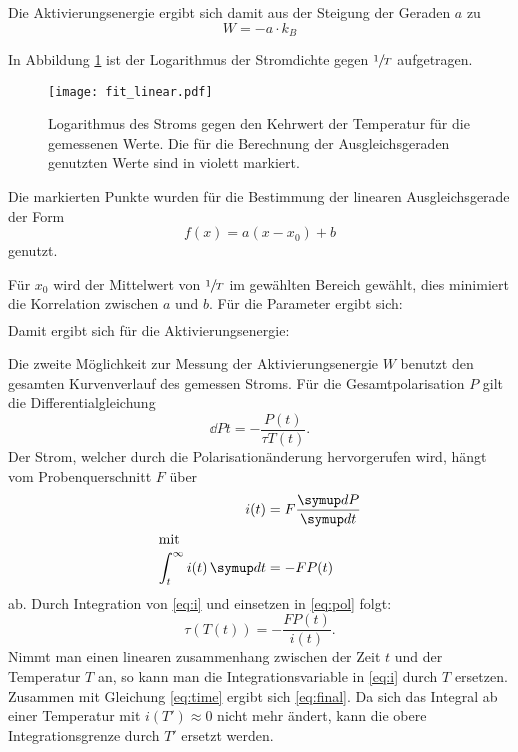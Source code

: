 Die Aktivierungsenergie ergibt sich damit aus der Steigung der Geraden $a$ zu
\begin{equation}
  W = - a \cdot k_B
\end{equation}

In Abbildung \ref{fig:lnj} ist der Logarithmus der Stromdichte gegen $\sfrac{1}{T}$ aufgetragen.

\begin{figure}
  \texttt{[image: fit\_linear.pdf]}
  \caption{%
    Logarithmus des Stroms gegen den Kehrwert der Temperatur für die gemessenen Werte.
    Die für die Berechnung der Ausgleichsgeraden genutzten Werte sind in violett markiert.
  }
  \label{fig:lnj}
\end{figure}

Die markierten Punkte wurden für die Bestimmung der linearen Ausgleichsgerade der Form
\begin{equation}
  f(x) = a (x - x_0) + b
\end{equation}
genutzt.

Für $x_0$ wird der Mittelwert von $\sfrac{1}{T}$ im gewählten Bereich gewählt, dies minimiert die Korrelation zwischen $a$ und $b$.
Für die Parameter ergibt sich:
\begin{align}
  
\end{align}
Damit ergibt sich für die Aktivierungsenergie:
\begin{equation}
  
\end{equation}


Die zweite Möglichkeit zur Messung der Aktivierungsenergie $W$ benutzt den gesamten Kurvenverlauf des gemessen Stroms.
Für die Gesamtpolarisation $P$ gilt die Differentialgleichung
\begin{equation}
  \dd{P}{t} = - \frac{P(t)}{\tau{T(t)}}.
  \label{eq:pol}
\end{equation}
Der Strom, welcher durch die Polarisationänderung hervorgerufen wird, hängt vom Probenquerschnitt $F$ über
\begin{align}
  i(t) &= F \dd{P}{t} \\
  \shortintertext{mit}
  \int_t^{\infty} i(t) \dif{t} &= -FP(t)
  \label{eq:i}
\end{align}
ab.
Durch Integration von  \eqref{eq:i} und einsetzen in \eqref{eq:pol} folgt:
\begin{equation}
  \tau(T(t)) = -\frac{F P(t)}{i(t)}.
  \label{eq:tau_t}
\end{equation}
Nimmt man einen linearen zusammenhang zwischen der Zeit $t$ und der Temperatur $T$ an, so kann man die Integrationsvariable in \eqref{eq:i} durch $T$ ersetzen.
Zusammen mit Gleichung \eqref{eq:time} ergibt sich \eqref{eq:final}. Da sich das Integral ab einer Temperatur mit $i(T') \approx 0$ nicht mehr ändert,
kann die obere Integrationsgrenze durch $T'$ ersetzt werden.

